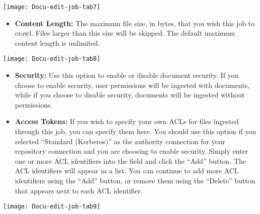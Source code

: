 \texttt{[image: Docu-edit-job-tab7]}

\begin{itemize}

\item \textbf{Content Length:} The maximum file size, in bytes, that
you wish this job to crawl. Files larger than this size will be
skipped. The default maximum content length is unlimited. 

\end{itemize}


\texttt{[image: Docu-edit-job-tab8]}

\begin{itemize}

\item \textbf{Security:} Use this option to enable or disable document
security. If you choose to enable security, user permissions will be
ingested with documents, while if you choose to disable security,
documents will be ingested without permissions.

\item \textbf{Access Tokens:} \label{ForceACL} If you wish to specify
your own ACLs for files ingested through this job, you can specify
them here. You should use this option if you selected ``Standard
(Kerberos)'' as the authority connection for your repository
connection and you are choosing to enable security. Simply enter one
or more ACL identifiers into the field and click the ``Add''
button. The ACL identifiers will appear in a list. You can continue to
add more ACL identifiers using the ``Add'' button, or remove them
using the ``Delete'' button that appears next to each ACL identifier.

\end{itemize}

\texttt{[image: Docu-edit-job-tab9]}


